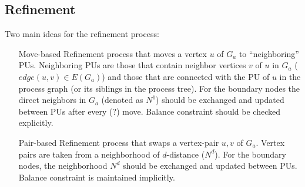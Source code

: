 \documentclass[a4paper,10pt]{article}
\newcommand{\quot}[1]{``#1''}
\begin{document}

\subsection{Refinement}
Two main ideas for the refinement process:
\begin{itemize}
\item [Move-based] Refinement process that moves a vertex $u$
  of $G_a$ to \quot{neighboring} PUs. Neighboring PUs are those that contain
  neighbor vertices $v$ of $u$ in $G_a$ ($edge (u,v) \in E(G_a)$) and those that
  are connected with the PU of $u$ in the process graph (or its siblings in the 
  process tree).
  For the boundary nodes the direct neighbors in $G_a$
  (denoted as $N^{1}$) should be exchanged and updated between PUs after every (?) move.
  Balance constraint should be checked explicitly.

\item [Pair-based] Refinement process that swaps a vertex-pair
  $u,v$ of $G_a$. Vertex pairs are taken from a neighborhood of $d$-distance
  ($N^{d}$). For the boundary nodes, the neighborhood $N^{d}$ should be
  exchanged and updated between PUs. Balance constraint is maintained implicitly.
\end{itemize}
\end{document}
